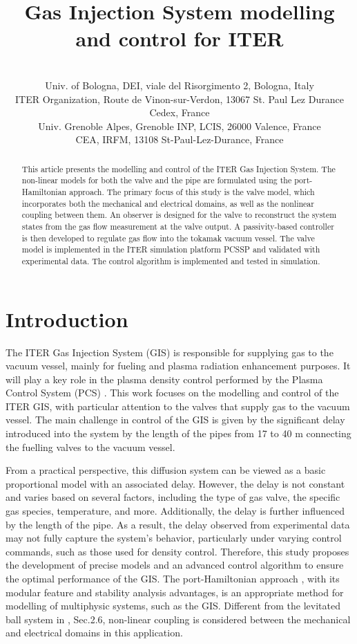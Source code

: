 \documentclass[letterpaper, 10pt, conference]{ieeeconf}
\date{}
\title{Gas Injection System modelling and control for ITER}
\author{\authorblockN{Dante Piotto\authorrefmark{1},
                        Anna Trang Vu\authorrefmark{2},
                        Luca Zabeo\authorrefmark{2}, 
                        Laurent Lef\`evre\authorrefmark{3}, 
                        Alessandro Macchelli\authorrefmark{1}, \\
                        Thomas Keenan\authorrefmark{2}, 
                        Remy Nouailletas\authorrefmark{4},
                        Timo Ravensbergen\authorrefmark{2},                          
                        Peter De Vries\authorrefmark{2},                        
                        David Weldon\authorrefmark{4}}\\
	\authorrefmark{1} Univ.  of Bologna, DEI, viale del Risorgimento 2, Bologna, Italy\\ %
	\authorrefmark{2} ITER Organization, Route de Vinon-sur-Verdon, 13067 St. Paul Lez Durance Cedex, France \\%
	\authorrefmark{3} Univ. Grenoble Alpes, Grenoble INP, LCIS, 26000 Valence, France \\ %
    \authorrefmark{4} CEA, IRFM, 13108 St-Paul-Lez-Durance, France %
    }
\begin{document}
\maketitle
\thispagestyle{empty}
\pagestyle{empty}

\begin{abstract}

This article presents the modelling and control of the ITER Gas Injection System. The non-linear models for both the valve and the pipe are formulated using the port-Hamiltonian approach. The primary focus of this study is the valve model, which incorporates both the mechanical and electrical domains, as well as the nonlinear coupling between them. An observer is designed for the valve to reconstruct the system states from the gas flow measurement at the valve output. A passivity-based controller is then developed to regulate gas flow into the tokamak vacuum vessel. The valve model is implemented in the ITER simulation platform PCSSP and validated with experimental data. The control algorithm is implemented and tested in simulation.

\end{abstract}
\section{Introduction}
The ITER Gas Injection System (GIS)\cite{GIS_2012} is responsible for supplying gas to the vacuum vessel, mainly for fueling and plasma radiation enhancement purposes. It will play a key role in the plasma density control performed by the Plasma Control System (PCS) \cite{deVries2024}. This work focuses on the modelling and control of the ITER GIS, with particular attention to the valves that supply gas to the vacuum vessel. The main challenge in control of the GIS is given by the significant delay introduced into the system by the length of the pipes from 17 to 40 m connecting the fuelling valves to the vacuum vessel.

From a practical perspective, this diffusion system can be viewed as a basic proportional model with an associated delay. However, the delay is not constant and varies based on several factors, including the type of gas valve, the specific gas species, temperature, and more. Additionally, the delay is further influenced by the length of the pipe. As a result, the delay observed from experimental data may not fully capture the system’s behavior, particularly under varying control commands, such as those used for density control. Therefore, this study proposes the development of precise models and an advanced control algorithm to ensure the optimal performance of the GIS.
The port-Hamiltonian approach \cite{maschke1993port,schaft2020}, with its modular feature and stability analysis advantages, is an appropriate method for modelling of multiphysic systems, such as the GIS. Different from the levitated ball system in \cite{schaft2020}, Sec.2.6, non-linear coupling is considered between the mechanical and electrical domains in this application.
\end{document}
